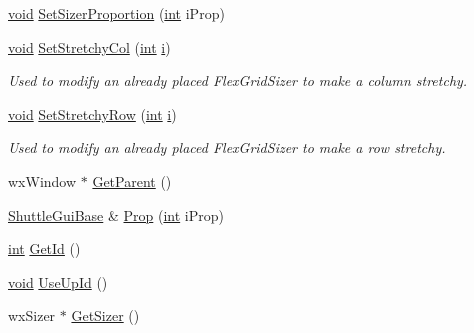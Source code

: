 \begin{DoxyCompactItemize}
\hyperlink{sound_8c_ae35f5844602719cf66324f4de2a658b3}{void} \hyperlink{class_shuttle_gui_base_a7ed44a99f25ebbdc1b91bce086e5e46d}{Set\+Sizer\+Proportion} (\hyperlink{xmltok_8h_a5a0d4a5641ce434f1d23533f2b2e6653}{int} i\+Prop)
\item 
\hyperlink{sound_8c_ae35f5844602719cf66324f4de2a658b3}{void} \hyperlink{class_shuttle_gui_base_ad4cabbeae683420ffe6ee2e279ede56f}{Set\+Stretchy\+Col} (\hyperlink{xmltok_8h_a5a0d4a5641ce434f1d23533f2b2e6653}{int} \hyperlink{checksum_8c_ab80e330a3bc9e38c1297fe17381e92b4}{i})
\begin{DoxyCompactList}\small\item\em Used to modify an already placed Flex\+Grid\+Sizer to make a column stretchy. \end{DoxyCompactList}\item 
\hyperlink{sound_8c_ae35f5844602719cf66324f4de2a658b3}{void} \hyperlink{class_shuttle_gui_base_a6f1a3303037df4c49caf2fd1804a6b19}{Set\+Stretchy\+Row} (\hyperlink{xmltok_8h_a5a0d4a5641ce434f1d23533f2b2e6653}{int} \hyperlink{checksum_8c_ab80e330a3bc9e38c1297fe17381e92b4}{i})
\begin{DoxyCompactList}\small\item\em Used to modify an already placed Flex\+Grid\+Sizer to make a row stretchy. \end{DoxyCompactList}\item 
wx\+Window $\ast$ \hyperlink{class_shuttle_gui_base_a8cf9a32c04e6cbbe231e629b1902871d}{Get\+Parent} ()
\item 
\hyperlink{class_shuttle_gui_base}{Shuttle\+Gui\+Base} \& \hyperlink{class_shuttle_gui_base_ab2a3c505c4621c26cf5c61a14bd09048}{Prop} (\hyperlink{xmltok_8h_a5a0d4a5641ce434f1d23533f2b2e6653}{int} i\+Prop)
\item 
\hyperlink{xmltok_8h_a5a0d4a5641ce434f1d23533f2b2e6653}{int} \hyperlink{class_shuttle_gui_base_a5e8956aa3e2dd4c665f1f43a9fe9547c}{Get\+Id} ()
\item 
\hyperlink{sound_8c_ae35f5844602719cf66324f4de2a658b3}{void} \hyperlink{class_shuttle_gui_base_a4b12f28004f07fd7f96004f86cf28e26}{Use\+Up\+Id} ()
\item 
wx\+Sizer $\ast$ \hyperlink{class_shuttle_gui_base_aea125766f6a197bfb4677ef1e6cd738f}{Get\+Sizer} ()
\end{DoxyCompactItemize}
